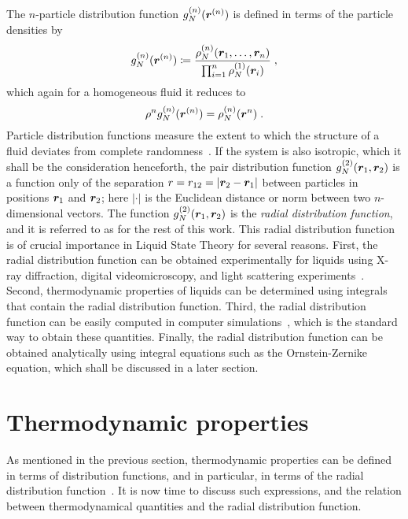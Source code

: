 The $n$-particle distribution function $g^{(n)}_{N} (\bm{r}^{(n)})$ is defined in terms
of the particle densities by
\begin{equation}
    g^{(n)}_{N} (\bm{r}^{(n)}) \coloneqq \frac{\rho^{(n)}_{N} (\bm{r}_{1}, \dots , \bm{r}_{n})}
    {\prod_{i=1}^{n} \rho^{(1)}_{N} (\bm{r}_{i})} \; ,
    \label{eq:gr-def}
\end{equation}
which again for a homogeneous fluid it reduces to
\begin{equation}
    \rho^{n} g^{(n)}_{N} (\bm{r}^{(n)}) = \rho^{(n)}_{N} (\bm{r}^{n}) \; .
    \label{eq:homogenous-gr}
\end{equation}
Particle distribution functions measure the extent to which the structure of a fluid 
deviates from complete randomness~\cite{hansenTheorySimpleLiquids2013}.
If the system is also isotropic, which it shall be the consideration henceforth,
the pair distribution function $g^{(2)}_{N} (\bm{r}_{1}, \bm{r}_{2})$ is a function only
of the separation $r = r_{12} = \lvert \bm{r}_{2} - \bm{r}_{1} \rvert$ between particles
in positions $\bm{r}_{1}$ and $\bm{r}_{2}$; here $\lvert \cdot \rvert$ is the Euclidean
distance or norm between two $n$-dimensional vectors.
The function $g^{(2)}_{N} (\bm{r}_{1}, \bm{r}_{2})$ is the
\emph{radial distribution function}, and it is referred to as 
\rdf for the rest of this work.
This radial distribution function is of crucial importance in Liquid State Theory for
several reasons. First, the radial distribution function can be obtained experimentally
for liquids using X-ray diffraction, digital videomicroscopy, and light scattering
experiments~\cite{mcquarrieStatisticalMechanics2000}.
Second, thermodynamic properties of liquids can be determined using integrals that
contain the radial distribution function. Third, the radial distribution function can
be easily computed in computer simulations~\cite{allenComputerSimulationLiquids2017}, 
which is the standard way to obtain these quantities. Finally, the radial distribution
function can be obtained analytically using integral equations such as the Ornstein-Zernike
equation, which shall be discussed in a later section.

\section{Thermodynamic properties}
As mentioned in the previous section, thermodynamic properties can be defined in terms of
distribution functions, and in particular, in terms of the radial distribution
function~\cite{hansenTheorySimpleLiquids2013}.
It is now time to discuss such expressions, and the relation between thermodynamical
quantities and the radial distribution function.

